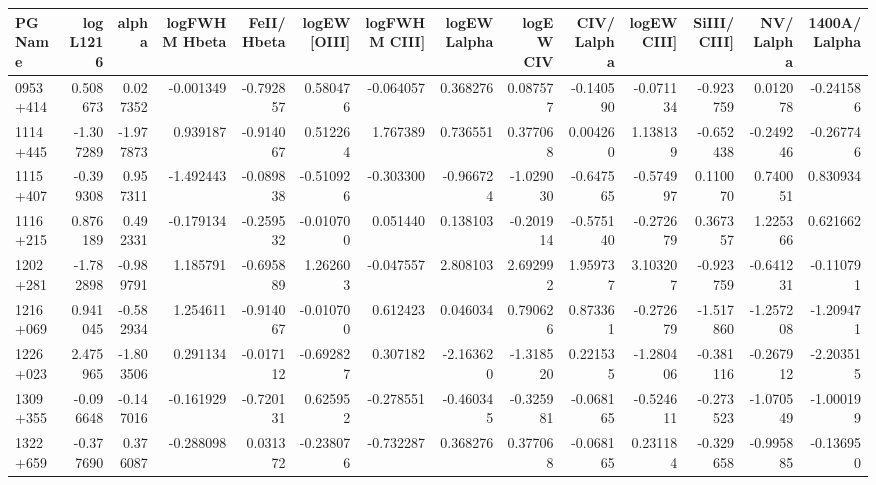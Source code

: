 \begin{tabular}{lrrrrrrrrrrrrr}
\toprule
  PG Name &  log L1216 &     alpha &  logFWHM Hbeta  &  FeII/ Hbeta  &  logEW [OIII] &  logFWHM CIII] &  logEW Lalpha &  logEW CIV &  CIV/ Lalpha &  logEW CIII] &  SiIII/ CIII] &  NV/ Lalpha &  1400A/ Lalpha \\
\midrule
 0953+414 &   0.508673 &  0.027352 &       -0.001349 &     -0.792857 &      0.580476 &      -0.064057 &      0.368276 &   0.087577 &    -0.140590 &    -0.071134 &     -0.923759 &    0.012078 &      -0.241586 \\
 1114+445 &  -1.307289 & -1.977873 &        0.939187 &     -0.914067 &      0.512264 &       1.767389 &      0.736551 &   0.377068 &     0.004260 &     1.138139 &     -0.652438 &   -0.249246 &      -0.267746 \\
 1115+407 &  -0.399308 &  0.957311 &       -1.492443 &     -0.089838 &     -0.510926 &      -0.303300 &     -0.966724 &  -1.029030 &    -0.647565 &    -0.574997 &      0.110070 &    0.740051 &       0.830934 \\
 1116+215 &   0.876189 &  0.492331 &       -0.179134 &     -0.259532 &     -0.010700 &       0.051440 &      0.138103 &  -0.201914 &    -0.575140 &    -0.272679 &      0.367357 &    1.225366 &       0.621662 \\
 1202+281 &  -1.782898 & -0.989791 &        1.185791 &     -0.695889 &      1.262603 &      -0.047557 &      2.808103 &   2.692992 &     1.959737 &     3.103207 &     -0.923759 &   -0.641231 &      -0.110791 \\
 1216+069 &   0.941045 & -0.582934 &        1.254611 &     -0.914067 &     -0.010700 &       0.612423 &      0.046034 &   0.790626 &     0.873361 &    -0.272679 &     -1.517860 &   -1.257208 &      -1.209471 \\
 1226+023 &   2.475965 & -1.803506 &        0.291134 &     -0.017112 &     -0.692827 &       0.307182 &     -2.163620 &  -1.318520 &     0.221535 &    -1.280406 &     -0.381116 &   -0.267912 &      -2.203515 \\
 1309+355 &  -0.096648 & -0.147016 &       -0.161929 &     -0.720131 &      0.625952 &      -0.278551 &     -0.460345 &  -0.325981 &    -0.068165 &    -0.524611 &     -0.273523 &   -1.070549 &      -1.000199 \\
 1322+659 &  -0.377690 &  0.376087 &       -0.288098 &      0.031372 &     -0.238076 &      -0.732287 &      0.368276 &   0.377068 &    -0.068165 &     0.231184 &     -0.329658 &   -0.995885 &      -0.136950 \\

\end{tabular}
